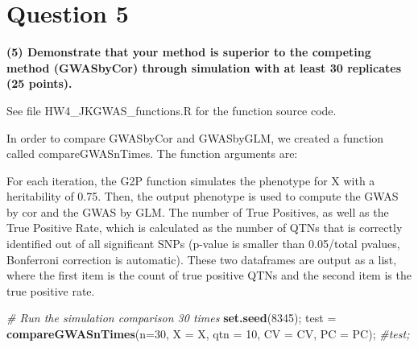 \documentclass[
]{article}
\newenvironment{Shaded}{\begin{snugshade}}{\end{snugshade}}
\newcommand{\CommentTok}[1]{\textcolor[rgb]{0.56,0.35,0.01}{\textit{#1}}}
\newcommand{\DataTypeTok}[1]{\textcolor[rgb]{0.13,0.29,0.53}{#1}}
\newcommand{\DecValTok}[1]{\textcolor[rgb]{0.00,0.00,0.81}{#1}}
\newcommand{\KeywordTok}[1]{\textcolor[rgb]{0.13,0.29,0.53}{\textbf{#1}}}
\newcommand{\NormalTok}[1]{#1}
\newcommand{\StringTok}[1]{\textcolor[rgb]{0.31,0.60,0.02}{#1}}
\begin{document}
\hypertarget{question-5}{%
\section{Question 5}\label{question-5}}

\textbf{(5) Demonstrate that your method is superior to the competing method (GWASbyCor) through simulation with at least 30 replicates (25 points).}

See file HW4\_JKGWAS\_functions.R for the function source code.

In order to compare GWASbyCor and GWASbyGLM, we created a function
called compareGWASnTimes. The function arguments are:

\par


\par


\par


\par
{}\par
{}\par

For each iteration, the G2P function simulates the phenotype for X with
a heritability of 0.75. Then, the output phenotype is used to compute
the GWAS by cor and the GWAS by GLM. The number of True Positives, as
well as the True Positive Rate, which is calculated as the number of
QTNs that is correctly identified out of all significant SNPs (p-value
is smaller than 0.05/total pvalues, Bonferroni correction is automatic).
These two dataframes are output as a list, where the first item is the
count of true positive QTNs and the second item is the true positive
rate.

\begin{Shaded}
\begin{Highlighting}[]
\CommentTok{\# Run the simulation comparison 30 times}
\KeywordTok{set.seed}\NormalTok{(}\DecValTok{8345}\NormalTok{);}
\NormalTok{test =}\StringTok{ }\KeywordTok{compareGWASnTimes}\NormalTok{(}\DataTypeTok{n=}\DecValTok{30}\NormalTok{, }\DataTypeTok{X =}\NormalTok{ X, }\DataTypeTok{qtn =} \DecValTok{10}\NormalTok{, }\DataTypeTok{CV =}\NormalTok{ CV, }\DataTypeTok{PC =}\NormalTok{ PC);}
\CommentTok{\#test;}
\end{Highlighting}
\end{Shaded}
\end{document}
